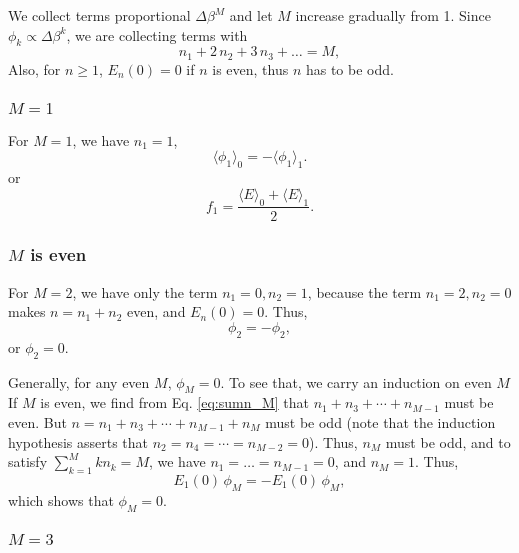 \documentclass[aip,jcp,preprint,notitlepage, superscriptaddress]{revtex4-1}
\begin{document}
We collect terms proportional $\Delta \beta^M$
and let $M$ increase gradually from 1.
%
Since $\phi_k \propto \Delta \beta^k$,
we are collecting terms with
\begin{equation}
n_1 + 2 \, n_2 + 3 \, n_3 + \dots = M,
\label{eq:sumn_M}
\end{equation}
Also,
for $n \ge 1$,
$E_n(0) = 0$ if $n$ is even,
thus $n$ has to be odd.



\subsubsection{$M = 1$}



For $M = 1$,
we have $n_1 = 1$,
\[
\langle \phi_1 \rangle_0
=
-\langle \phi_1 \rangle_1.
\]
or
\[
f_1 =
\frac{
  \langle E \rangle_0
  +
  \langle E \rangle_1
}{ 2 }.
\]



\subsubsection{$M$ is even}



For $M = 2$,
we have only the term $n_1 = 0, n_2 = 1$,
because the term $n_1 = 2, n_2 = 0$
makes $n = n_1 + n_2$ even,
and $E_n(0) = 0$.
%
Thus,
\[
\phi_2
=
-\phi_2,
\]
or $\phi_2 = 0$.



Generally,
for any even $M$,
$\phi_M = 0$.
%
To see that, we carry an induction on even $M$
%
If $M$ is even,
we find from Eq. \eqref{eq:sumn_M} that
$n_1 + n_3 + \cdots + n_{M - 1}$ must be even.
But
$n = n_1 + n_3 + \cdots + n_{M - 1} + n_M$
must be odd
(note that the induction hypothesis asserts
that $n_2 = n_4 = \cdots = n_{M-2} = 0$).
%
Thus, $n_M$ must be odd,
and to satisfy $\sum_{k = 1}^M k n_k = M$,
we have $n_1 = \dots = n_{M-1} = 0$,
and $n_M = 1$.
%
Thus,
%
\[
E_1(0) \, \phi_M
=
-E_1(0) \, \phi_M,
\]
which shows that $\phi_M = 0$.



\subsubsection{$M = 3$}
\end{document}
